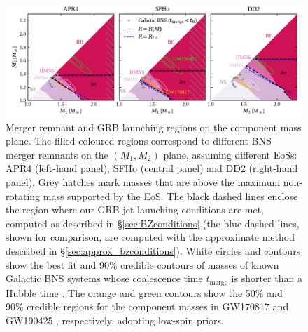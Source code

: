 \documentclass[]{aa}
\newcommand{\resp}[1]{#1}
\begin{document}
\begin{figure}
\centering
\includegraphics[width=\textwidth]{figures/M1_M2_plane.pdf}   
\caption{Merger remnant and GRB launching regions on the component mass plane. The filled coloured regions correspond to different BNS merger remnants on the $(M_1,M_2)$ plane, assuming different EoSs: APR4 (left-hand panel), SFHo (central panel) and DD2 (right-hand panel). Grey hatches mark masses that are above the maximum non-rotating mass supported by the EoS. The black dashed lines enclose the region where our GRB jet launching conditions are met, computed as described in \S\ref{sec:BZconditions} (the blue dashed lines, shown for comparison, are computed with the approximate method described in \S\ref{sec:approx_bzconditions}). White circles and contours show the best fit and 90\% credible contours of masses of known Galactic BNS systems \resp{whose coalescence time $t_\mathrm{merge}$ is shorter than} a Hubble time \citep[$t_\mathrm{H}$, data from ][]{Farrow2019}. 
The orange and green contours show the 50\% and 90\% credible regions for the component masses in GW170817 \citep{Abbott2019_GW170817_properties} and GW190425 \citep{Abbott2020_GW190425}, respectively, adopting low-spin priors.}
\label{fig:M1_M2_plane}
\end{figure}  
%
\end{document}
